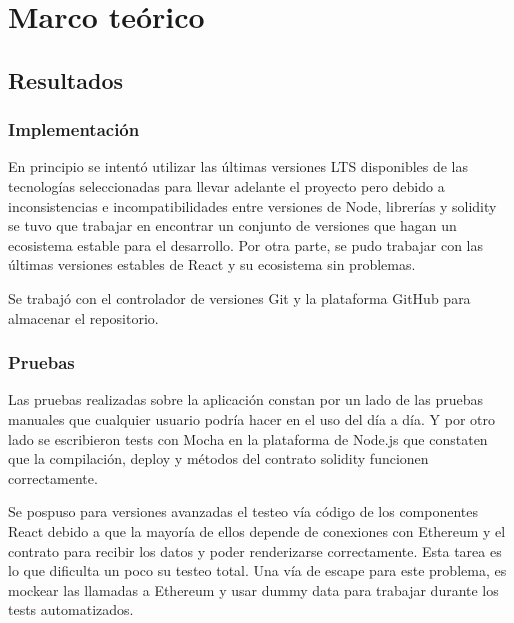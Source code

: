 
\chapter{Marco teórico}

\ifpdf
    \graphicspath{{Chapter4/Figs/}{Chapter4/Figs/PDF/}{Chapter4/Figs/}}
\else
    \graphicspath{{Chapter4/Figs/}{Chapter4/Figs/}}
\fi


\section{Resultados}

\subsection{Implementación}
En principio se intentó utilizar las últimas versiones LTS disponibles de las tecnologías
seleccionadas para llevar adelante el proyecto pero debido a inconsistencias e incompatibilidades
entre versiones de Node, librerías y solidity se tuvo que trabajar en encontrar un conjunto de
versiones que hagan un ecosistema estable para el desarrollo. Por otra parte, se pudo trabajar con
las últimas versiones estables de React y su ecosistema sin problemas.

Se trabajó con el controlador de versiones Git y la plataforma GitHub para almacenar el
repositorio.

\subsection{Pruebas}
Las pruebas realizadas sobre la aplicación constan por un lado de las pruebas manuales que
cualquier
usuario podría hacer en el uso del día a día. Y por otro lado se escribieron tests con Mocha en la
plataforma de Node.js que constaten que la compilación, deploy y métodos del contrato solidity
funcionen correctamente.

Se pospuso para versiones avanzadas el testeo vía código de los componentes React debido a que la
mayoría de ellos depende de conexiones con Ethereum y el contrato para recibir los datos y poder
renderizarse correctamente. Esta tarea es lo que dificulta un poco su testeo total. Una vía de escape
para este problema, es mockear las llamadas a Ethereum y usar dummy data para trabajar durante los
tests automatizados.

